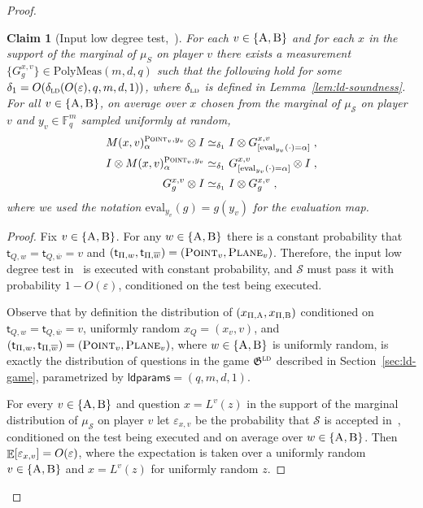 \documentclass[11pt]{article}
\newtheorem{claim}[theorem]{Claim}
\theoremstyle{definition}
\newcommand{\ol}[1]{\overline{#1}}
\newcommand{\F}{\ensuremath{\mathbb{F}}}
\newcommand{\ot}{\otimes}
\newcommand{\ld}{\textsc{ld}}
\newcommand{\eps}{\varepsilon}
\newcommand{\E}{\mathop{\mathbb{E}}\displaylimits} %
\newcommand{\game}{\mathfrak{G}}
\newcommand{\sampler}{\mathcal{S}}
\newcommand{\strategy}{\mathscr{S}}
\newcommand{\labelstyle}[1]{\ensuremath{\textsc{#1}}\xspace}
\newcommand{\tvarstyle}[1]{\mathsf{#1}}
\newcommand{\tvar}{\ensuremath{\tvarstyle{t}}}
\newcommand{\alice}{\labelstyle{A}}
\newcommand{\bob}{\labelstyle{B}}
\newcommand{\typestyle}[1]{\ensuremath{\textsc{#1}}\xspace}
\newcommand{\Plane}{\typestyle{Plane}}
\newcommand{\Point}{\typestyle{Point}}
\newcommand{\ldparams}{\mathsf{ldparams}}
\newcommand{\polymeas}[3]{\mathrm{PolyMeas}(#1,#2,#3)}
\newcommand{\eval}{\mathrm{eval}}
\begin{document}
\begin{proof}
	\begin{claim}[Input low degree test,~]\label{claim:ar-3}
    For each $v \in \{\alice,\bob\}$ and for each $x$ in the support of the
    marginal of $\mu_S$ on player $v$ there exists a measurement
    $\{G^{{x},v}_{g}\} \in \polymeas{m}{d}{q}$ such that the following hold for
    some $\delta_1 = O(\delta_{\ld}(O({\eps}), q, m, d, 1))$, where
    $\delta_{\ld}$ is defined in Lemma~\ref{lem:ld-soundness}.
    For all $v\in\{\alice,\bob\}$, on average over ${x}$ chosen from the
    marginal of $\mu_{\sampler}$ on player $v$ and $y_v\in \F_q^m$ sampled
    uniformly at random,
    \begin{align}
      M({x}, v)^{\Point_v,y_v}_{\alpha}\ot I
      & \simeq_{\delta_1} I \ot G^{{x}, v}_{[\eval_{y_v}(\cdot) =
        \alpha]}\;, \label{eq:ld-single-input} \\
      I\ot  M({x}, v)^{\Point_v,y_v}_{\alpha}
      & \simeq_{\delta_1}  G^{{x}, v}_{[\eval_{y_v}(\cdot) =
        \alpha]} \ot I\;, \label{eq:ld-single-input-b} \\
      G^{{x}, v}_{g} \ot I
      & \simeq_{\delta_1} I \ot G^{{x},
        v}_{g}\;,\label{eq:ld-self-input}
    \end{align}
    where we used the notation $\eval_{y_v}(g)=g(y_v)$ for the evaluation map.
	\end{claim}
	
	\begin{proof}
    Fix $v\in\{\alice,\bob\}$.
    For any $w\in\{\alice,\bob\}$ there is a constant probability that
    $\tvar_{Q,w} = \tvar_{Q,\ol{w}} = v$ and $(\tvar_{\Pi,w}, \tvar_{\Pi,
      \ol{w}}) = (\Point_{v}, \Plane_{v})$.
    Therefore, the input low degree test in~ is executed
    with constant probability, and $\strategy$ must pass it with probability
    $1-O(\eps)$, conditioned on the test being executed.
			
    Observe that by definition the distribution of
    $(x_{\Pi,\alice},x_{\Pi,\bob})$ conditioned on $\tvar_{Q,w} =
    \tvar_{Q,\ol{w}} = v$, uniformly random $x_Q = (x_v,v)$, and
    $(\tvar_{\Pi,w}, \tvar_{\Pi, \ol{w}}) = (\Point_{v}, \Plane_{v})$, where
    $w\in\{\alice,\bob\}$ is uniformly random, is exactly the distribution of
    questions in the game $\game^\ld$ described in Section~\ref{sec:ld-game},
    parametrized by $\ldparams = (q, m, d, 1)$.
			
    For every $v\in\{\alice,\bob\}$ and question $x=L^v(z)$ in the support of
    the marginal distribution of $\mu_\sampler$ on player $v$ let $\eps_{x,v}$
    be the probability that $\strategy$ is accepted in~,
    conditioned on the test being executed and on average over
    $w\in\{\alice,\bob\}$.
    Then $\E[\eps_{x,v}] = O(\eps)$, where the expectation is taken over a
    uniformly random $v\in\{\alice,\bob\}$ and $x=L^v(z)$ for uniformly random
    $z$.


\end{proof}
\end{proof}
\end{document}
